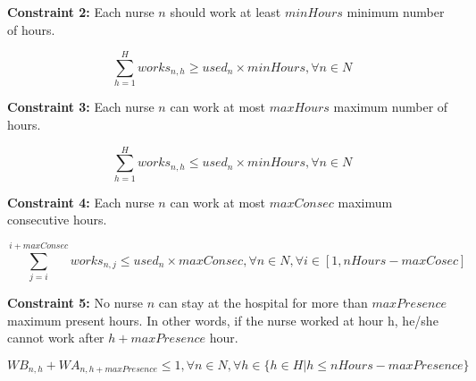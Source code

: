 \documentclass{article}
\newcommand\tab[1][1cm]{\hspace*{#1}}
\begin{document}
\tab \textbf{Constraint 2:} Each nurse $n$ should work at least $minHours$ minimum number of hours.\\
\begin{minipage}{\linewidth}
	\begin{equation}
		\sum_{h=1}^H works_{n,h} \geq used_n \times minHours, \forall n \in N
	\end{equation}
\end{minipage}

\tab \textbf{Constraint 3:} Each nurse $n$ can work at most $maxHours$ maximum number of hours.\\
\begin{minipage}{\linewidth}
	\begin{equation}
		\sum_{h=1}^H works_{n,h} \leq used_n \times minHours, \forall n \in N
	\end{equation}
\end{minipage}

\tab \textbf{Constraint 4:} Each nurse $n$ can work at most $maxConsec$ maximum consecutive hours.\\
\begin{minipage}{\linewidth}
	\begin{equation}
		\sum_{j=i}^{i+maxConsec} works_{n,j} \leq used_n \times maxConsec, \forall n \in N, \forall i \in [1,nHours-maxCosec]
	\end{equation}
\end{minipage}

\tab \textbf{Constraint 5:} No nurse $n$ can stay at the hospital for more than $maxPresence$ maximum present hours. In other words, if the nurse worked at hour h, he/she cannot work after $h+maxPresence$ hour.\\
\begin{minipage}{\linewidth}
	\begin{equation}
		WB_{n,h} + WA_{n,h+maxPresence} \leq 1, \forall n \in N, \forall h \in \{h \in H|h \leq nHours-maxPresence \}
	\end{equation}
\end{minipage}
\end{document}
